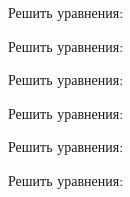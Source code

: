 \begin{enumcols}[label=\textbf{\arabic*.}]
	\item Решить уравнения:
	\begin{enumcols}[columns=3]
		\item {}
		\item {}
		\item {}
		\item {}
		\item {}
		\item {}
	\end{enumcols}
	\item Решить уравнения:
	\begin{enumcols}[columns=3]
		\item {}
		\item {}
		\item {}
		\item {}
		\item {}
		\item {}
	\end{enumcols}
	\item Решить уравнения:
	\begin{enumcols}[columns=3]
		\item {}
		\item {}
		\item {}
		\item {}
		\item {}
	\end{enumcols}
	\item Решить уравнения:
	\begin{enumcols}[columns=3]
		\item {}
		\item {}
		\item {}
		\item {}
		\item {}
	\end{enumcols}
	\item Решить уравнения:
	\begin{enumcols}[columns=2]
		\item {}
		\item {}
	\end{enumcols}
	\item Решить уравнения:

\end{enumcols}
